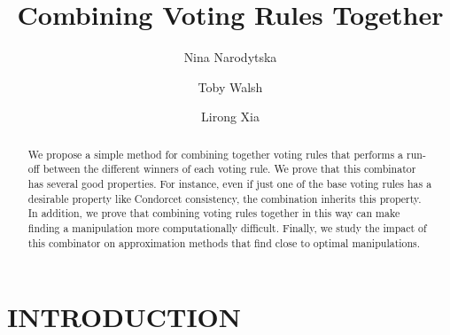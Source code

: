 \documentclass{ecai2012}
\begin{document}
\title{Combining Voting Rules Together}

\author{Nina Narodytska \and Toby Walsh \and Lirong Xia }



\maketitle


\begin{abstract}
We propose a simple method for combining together
voting rules that performs a run-off between
the different winners of each voting rule.
We prove that this combinator has several
good properties. For instance, even if just
one of the base voting rules has a desirable
property like Condorcet consistency,
the combination inherits this property. In addition, we prove
that combining voting rules together in this
way can make finding a manipulation more
computationally difficult. Finally,
we study the impact of this combinator
on approximation methods that
find close to optimal manipulations.
\end{abstract}

\section{INTRODUCTION}
\end{document}

